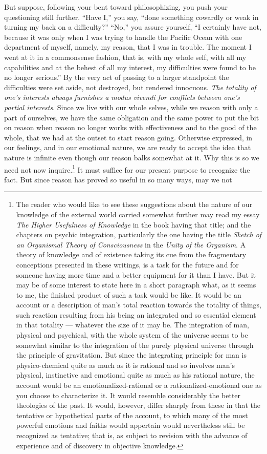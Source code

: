 \documentclass[a4paper, 11pt, oneside, polutonikogreek, english]{article}
\begin{document}
But suppose, following your bent toward philosophizing, you push your questioning still further. ``Have I,'' you say, ``done something cowardly or weak in turning my back on a difficulty?'' ``No,'' you assure yourself, ``I certainly have not, because it was only when I was trying to handle the Pacific Ocean with one department of myself, namely, my reason, that I was in trouble. The moment I went at it in a commonsense fashion, that is, with my whole self, with all my capabilities and at the behest of all my interest, my difficulties were found to be no longer serious.'' By the very act of passing to a larger standpoint the difficulties were set aside, not destroyed, but rendered innocuous. \emph{The totality of one's interests always furnishes a modus vivendi for conflicts between one's partial interests}. Since we live with our whole selves, while we reason with only a part of ourselves, we have the same obligation and the same power to put the bit on reason when reason no longer works with effectiveness and to the good of the whole, that we had at the outset to start reason going. Otherwise expressed, in our feelings, and in our emotional nature, we are ready to accept the idea that nature is infinite even though our reason balks somewhat at it. Why this is so we need not now inquire.\footnote{The reader who would like to see these suggestions about the nature of our knowledge of the external world carried somewhat further may read my essay \emph{The Higher Usefulness of Knowledge} in the book having that title; and the chapters on psychic integration, particularly the one having the title \emph{Sketch of an Organismal Theory of Consciousness} in the \emph{Unity of the Organism}. A theory of knowledge and of existence taking its cue from the fragmentary conceptions presented in these writings, is a task for the future and for someone having more time and a better equipment for it than I have. But it may be of some interest to state here in a short paragraph what, as it seems to me, the finished product of such a task would be like. It would be an account or a description of man's total reaction towards the totality of things, such reaction resulting from his being an integrated and so essential element in that totality --- whatever the size of it may be. The integration of man, physical and psychical, with the whole system of the universe seems to be somewhat similar to the integration of the purely physical universe through the principle of gravitation. But since the integrating principle for man is physico-chemical quite as much as it is rational and so involves man's physical, instinctive and emotional quite as much as his rational nature, the account would be an emotionalized-rational or a rationalized-emotional one as you choose to characterize it. It would resemble considerably the better theologies of the past. It would, however, differ sharply from these in that the tentative or hypothetical parts of the account, to which many of the most powerful emotions and faiths would appertain would nevertheless still be recognized as tentative; that is, as subject to revision with the advance of experience and of discovery in objective knowledge.} It must suffice for our present purpose to recognize the fact. But since reason has proved so useful in so many ways, may we not 
\end{document}
